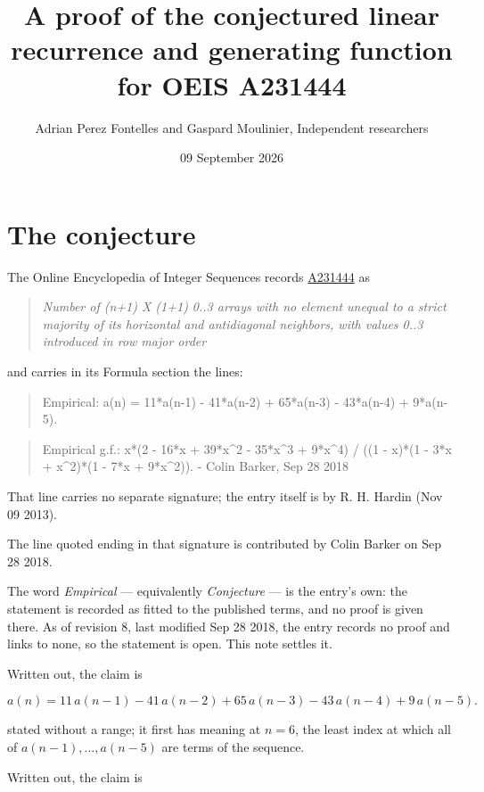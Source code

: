 \documentclass[11pt]{article}
\title{A proof of the conjectured linear recurrence and generating function for OEIS A231444}
\author{Adrian Perez Fontelles and Gaspard Moulinier, Independent researchers}
\date{09 September 2026}
\theoremstyle{definition}
\begin{document}
\maketitle
\section{The conjecture}

The Online Encyclopedia of Integer Sequences records \href{https://oeis.org/A231444}{A231444} as

\begin{quote}\itshape Number of (n+1) X (1+1) 0..3 arrays with no element unequal to a strict majority of its horizontal and antidiagonal neighbors, with values 0..3 introduced in row major order\end{quote}

and carries in its Formula section the lines:

\begin{quote}\ttfamily Empirical: a(n) = 11*a(n-1) - 41*a(n-2) + 65*a(n-3) - 43*a(n-4) + 9*a(n-5).\end{quote}

\begin{quote}\ttfamily Empirical g.f.: x*(2 - 16*x + 39*x\textasciicircum{}2 - 35*x\textasciicircum{}3 + 9*x\textasciicircum{}4) / ((1 - x)*(1 - 3*x + x\textasciicircum{}2)*(1 - 7*x + 9*x\textasciicircum{}2)). - Colin Barker, Sep 28 2018\end{quote}

That line carries no separate signature; the entry itself is by R. H. Hardin (Nov 09 2013).

The line quoted ending in that signature is contributed by Colin Barker on Sep 28 2018.

The word {\itshape Empirical} --- equivalently {\itshape Conjecture} --- is the entry's own: the statement is recorded as fitted to the published terms, and no proof is given there. As of revision 8, last modified Sep 28 2018, the entry records no proof and links to none, so the statement is open. This note settles it.

Written out, the claim is

\[a(n) = 11\,a(n-1) - 41\,a(n-2) + 65\,a(n-3) - 43\,a(n-4) + 9\,a(n-5).\]

stated without a range; it first has meaning at $n = 6$, the least index at which all of $a(n-1),\dots,a(n-5)$ are terms of the sequence.

Written out, the claim is
\end{document}
